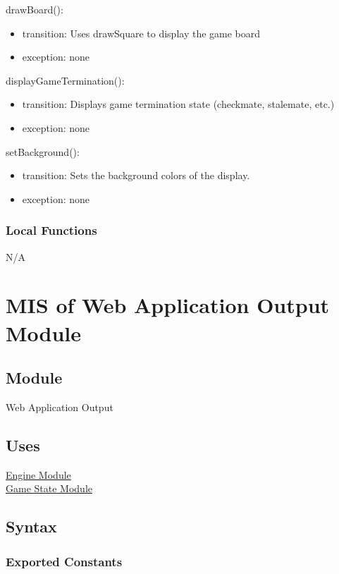 \documentclass[12pt, titlepage]{article}
\begin{document}
        \noindent drawBoard():
        \begin{itemize}
            \item transition: Uses drawSquare to display the game board
            \item exception: none
        \end{itemize}

        \noindent displayGameTermination():
        \begin{itemize}
            \item transition: Displays game termination state (checkmate, stalemate, etc.)
            \item exception: none
        \end{itemize}

        \noindent setBackground():
        \begin{itemize}
            \item transition: Sets the background colors of the display.
            \item exception: none
        \end{itemize}

    \subsubsection{Local Functions}
    N/A

    \newpage

\section{MIS of Web Application Output Module} \label{mOutput}

    \subsection{Module}
    Web Application Output

    \subsection{Uses}
    \hyperref[mEngine]{Engine Module}\\
    \hyperref[mGame]{Game State Module}

    \subsection{Syntax}
    \subsubsection{Exported Constants}
\end{document}
